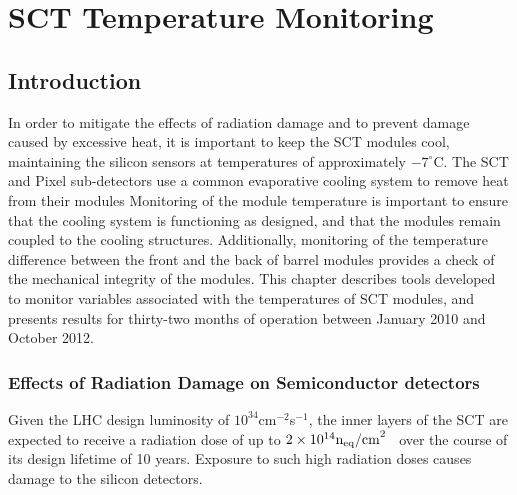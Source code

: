 \graphicspath{{Chapters/SCT/Figures/}}

\chapter{SCT Temperature Monitoring}
\label{chap:SCT}

\section{Introduction}

In order to mitigate the effects of radiation damage and to prevent damage
caused by excessive heat, it is important to keep
the SCT modules cool, maintaining the silicon sensors at temperatures of approximately $-7^{\circ}$C. The
SCT and Pixel sub-detectors use a common evaporative cooling system to remove
heat from their modules
Monitoring of the module
temperature is important to ensure that the cooling system is functioning as
designed, and that the modules remain coupled to the cooling structures.
Additionally, monitoring of the temperature difference between the front and the
back of barrel modules provides a check of the mechanical integrity of the
modules. This
chapter describes tools developed to monitor variables associated with the
temperatures of SCT modules, and presents results for thirty-two months of
operation between January 2010 and October 2012.



\subsection{Effects of Radiation Damage on Semiconductor detectors}
Given the LHC design luminosity of $10^{34}$cm$^{-2}$s$^{-1}$, the
inner layers of the 
SCT are expected to receive a radiation dose of up to
$2\times10^{14}\rm{n_{eq}/cm}^2$~\cite{Ahmad200798} over the course of its design
lifetime of 10 years.
Exposure to such high radiation doses causes damage to the silicon detectors. 

